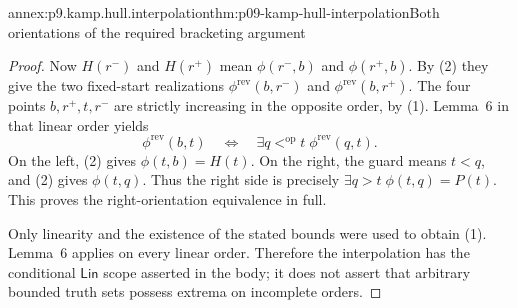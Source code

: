\begin{annexitem}{annex:p9.kamp.hull.interpolation}{thm:p09-kamp-hull-interpolation}{Both orientations of the required bracketing argument}
\begin{proof}
Now \(H(r^-)\) and \(H(r^+)\) mean
\(\phi(r^-,b)\) and \(\phi(r^+,b)\). By (2) they
give the two fixed-start realizations
\(\phi^{\mathrm{rev}}(b,r^-)\) and
\(\phi^{\mathrm{rev}}(b,r^+)\). The four points
\(b,r^+,t,r^-\) are strictly increasing in the opposite
order, by (1). Lemma~6 in that linear order yields
\[
 \phi^{\mathrm{rev}}(b,t)
 \quad\Longleftrightarrow\quad
 \exists q<^{\mathrm{op}}t\;
                      \phi^{\mathrm{rev}}(q,t).
\]
On the left, (2) gives \(\phi(t,b)=H(t)\).
On the right, the guard means \(t<q\), and (2) gives
\(\phi(t,q)\). Thus the right side is precisely
\(\exists q>t\;\phi(t,q)=P(t)\). This proves the
right-orientation equivalence in full.

Only linearity and the existence of the stated bounds were used
to obtain (1). Lemma~6 applies on every linear order. Therefore
the interpolation has the conditional \(\mathsf{Lin}\)
scope asserted in the body; it does not assert that arbitrary
bounded truth sets possess extrema on incomplete orders.
\end{proof}
\end{annexitem}

